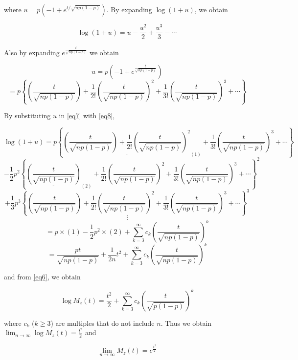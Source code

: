 \noindent
where \(u = p(-1 + e^{t/\sqrt{np(1-p)}})\). By expanding \(\log(1+u)\), we obtain

\begin{equation}
\log(1+u)=u- \frac{u^{2}}{2} + \frac{u^{3}}{3} - \cdots
\label{eq7}
\end{equation}

\noindent
Also by expanding \(e^{\frac{t}{\sqrt{np(1-p)}}}\) we obtain

\[
u=p(-1+e^{\frac{t}{\sqrt{np(1-p)}}})
\]
\begin{equation}
=p\left\{\left(\frac{t}{\sqrt{np(1-p)}} \right)
+ \frac{1}{2!}\left(\frac{t}{\sqrt{np(1-p)}}\right)^{2}
+ \frac{1}{3!}\left(\frac{t}{\sqrt{np(1-p)}}\right)^{3}
+ \cdots 
\right\}
\label{eq8}
\end{equation}

\noindent
By substituting \(u\) in \ref{eq7} with \ref{eq8},

\[ \log(1+u)=
p\left\{\underline{\left(\frac{t}{\sqrt{np(1-p)}} \right)
+ \frac{1}{2!}\left(\frac{t}{\sqrt{np(1-p)}}\right)^{2}}_{(1)}
+ \frac{1}{3!}\left(\frac{t}{\sqrt{np(1-p)}}\right)^{3}
+ \cdots 
\right\}
\]
\[-
\frac{1}{2}p^{2}\left\{\underline{\left(\frac{t}{\sqrt{np(1-p)}} \right)}_{(2)}
+ \frac{1}{2!}\left(\frac{t}{\sqrt{np(1-p)}}\right)^{2}
+ \frac{1}{3!}\left(\frac{t}{\sqrt{np(1-p)}}\right)^{3}
+ \cdots 
\right\}^{2}
\]
\[+
\frac{1}{3}p^{3}\left\{\left(\frac{t}{\sqrt{np(1-p)}} \right)
+ \frac{1}{2!}\left(\frac{t}{\sqrt{np(1-p)}}\right)^{2}
+ \frac{1}{3!}\left(\frac{t}{\sqrt{np(1-p)}}\right)^{3}
+ \cdots 
\right\}^{3}
\]
\[
\vdots
\]
\[ = p\times (1) - \frac{1}{2}p^{2}\times (2) 
   + \sum_{k=3}^{\infty}c_{k}\left(\frac{t}{\sqrt{np(1-p)}}\right)^{k}
\]
\begin{equation}
   = \frac{pt}{\sqrt{np(1-p)}} + \frac{1}{2n}t^{2} + \sum_{k=3}^{\infty}c_{k}\left(\frac{t}{\sqrt{np(1-p)}}\right)^{k}
\end{equation}

\noindent
and from \ref{eq6}, we obtain

\begin{equation}
\log M_{z}(t) = \frac{t^{2}}{2} + \sum_{k=3}^{\infty}c_{k}\left(\frac{t}{\sqrt{p(1-p)}}\right)^{k}%
\end{equation}

\noindent
where \(c_{k}\) (\(k \geq 3\)) are multiples that do not include \(n\). Thus we obtain \(\lim_{n\to\infty}\log M_{z}(t) = \frac{t^{2}}{2}\) and

\begin{equation}
\lim_{n\to\infty} M_{z}(t)= e^{\frac{t^{2}}{2}}
\label{eq_bino_mo}
\end{equation}

